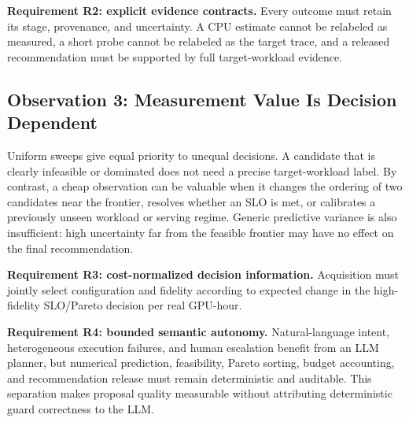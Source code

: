 \textbf{Requirement R2: explicit evidence contracts.}  Every outcome must retain
its stage, provenance, and uncertainty.  A CPU estimate cannot be relabeled as
measured, a short probe cannot be relabeled as the target trace, and a released
recommendation must be supported by full target-workload evidence.

\subsection{Observation 3: Measurement Value Is Decision Dependent}

Uniform sweeps give equal priority to unequal decisions.  A candidate that is
clearly infeasible or dominated does not need a precise target-workload label.
By contrast, a cheap observation can be valuable when it changes the ordering
of two candidates near the frontier, resolves whether an SLO is met, or
calibrates a previously unseen workload or serving regime.  Generic predictive variance is also
insufficient: high uncertainty far from the feasible frontier may have no
effect on the final recommendation.

\textbf{Requirement R3: cost-normalized decision information.}  Acquisition
must jointly select configuration and fidelity according to expected change in
the high-fidelity SLO/Pareto decision per real GPU-hour.

\textbf{Requirement R4: bounded semantic autonomy.}  Natural-language intent,
heterogeneous execution failures, and human escalation benefit from an LLM
planner, but numerical prediction, feasibility, Pareto sorting, budget
accounting, and recommendation release must remain deterministic and auditable.
This separation makes proposal quality measurable without attributing
deterministic guard correctness to the LLM.
